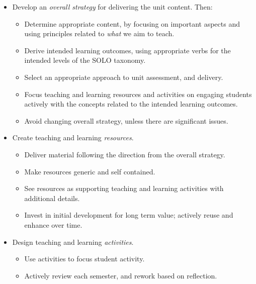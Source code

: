 \begin{itemize}[noitemsep,nolistsep]
	\item Develop an \emph{overall strategy} for delivering the unit content. Then:
	\begin{itemize}[noitemsep,nolistsep]
		\item Determine appropriate content, by focusing on important aspects and using principles related to \emph{what} we aim to teach.
		\item Derive intended learning outcomes, using appropriate verbs for the intended levels of the SOLO taxonomy.
		\item Select an appropriate approach to unit assessment, and delivery.
		\item Focus teaching and learning resources and activities on engaging students actively with the concepts related to the intended learning outcomes.
		\item Avoid changing overall strategy, unless there are significant issues.
	\end{itemize}

	\item Create teaching and learning \emph{resources}.
	\begin{itemize}[noitemsep,nolistsep]
		\item Deliver material following the direction from the overall strategy.
		\item Make resources generic and self contained.
		\item See resources as supporting teaching and learning activities with additional details.
		\item Invest in initial development for long term value; actively reuse and enhance over time.
	\end{itemize}

	\item Design teaching and learning \emph{activities}.
	\begin{itemize}[noitemsep,nolistsep]
		\item Use activities to focus student activity.
		\item Actively review each semester, and rework based on reflection.
	\end{itemize}
\end{itemize} 


